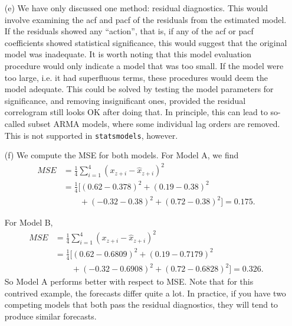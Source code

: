 \documentclass[11pt,a4paper]{article}
\begin{document}
\begin{itemize}
\begin{itemize}
\item[(e)] %
We have only discussed one method: residual diagnostics. This would involve examining the acf
and pacf of the residuals from the estimated model. If the residuals showed
any ``action'', that is, if any of the acf or pacf coefficients showed
statistical significance, this would suggest that the original model was
inadequate. It is worth noting that this model evaluation
procedure would only indicate a model that was too small. If the model were
too large, i.e. it had superfluous terms, these procedures would deem the
model adequate. This could be solved by testing the model parameters for significance, and removing insignificant ones,
provided the residual correlogram still looks OK after doing that. In principle, this can lead to so-called subset ARMA models, where
some individual lag orders are removed. This is not supported in \texttt{statsmodels}, however.
\item[(f)]
We compute the MSE for both models. For Model A, we find
\begin{align*}
MSE &= \frac{1}{4}\sum_{i=1}^4 (x_{z+i}-\hat x_{z+i})^2\\
&=\frac{1}{4}\Big[ (0.62 - 0.378)^2 + (0.19 - 0.38)^2 \\&\qquad+ (-0.32 - 0.38)^2 + (0.72 - 0.38)^2\Big] = 0.175.
\end{align*}

For Model B,
\begin{align*}
MSE &= \frac{1}{4}\sum_{i=1}^4 (x_{z+i}-\hat x_{z+i})^2\\
&=\frac{1}{4}\Big[ (0.62 -  0.6809)^2 + (0.19 - 0.7179)^2\\&\qquad + (-0.32 - 0.6908)^2 + (0.72 - 0.6828)^2\Big] = 0.326.
\end{align*}
So Model A performs better with respect to MSE. Note that for this contrived example, the forecasts differ quite a lot. In practice, if you have two competing models
that both pass the residual diagnostics, they will tend to produce similar forecasts.
\end{itemize}
\end{itemize}
\newpage
\end{document}
